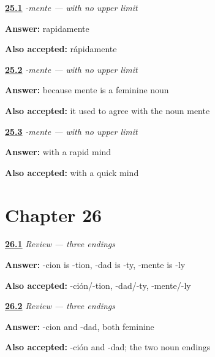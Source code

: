 \noindent\begin{minipage}[t]{\linewidth}
\raggedright
\hyperlink{review-ES-C56-mente-make}{\textbf{25.1}} \emph{-mente — with no upper limit}\par
\small \textbf{Answer:} rapidamente\par
\footnotesize \textbf{Also accepted:} rápidamente
\end{minipage}\par\medskip

\noindent\begin{minipage}[t]{\linewidth}
\raggedright
\hyperlink{review-ES-C56-mente-fem}{\textbf{25.2}} \emph{-mente — with no upper limit}\par
\small \textbf{Answer:} because mente is a feminine noun\par
\footnotesize \textbf{Also accepted:} it used to agree with the noun mente
\end{minipage}\par\medskip

\noindent\begin{minipage}[t]{\linewidth}
\raggedright
\hyperlink{review-ES-C56-mente-literal}{\textbf{25.3}} \emph{-mente — with no upper limit}\par
\small \textbf{Answer:} with a rapid mind\par
\footnotesize \textbf{Also accepted:} with a quick mind
\end{minipage}\par\medskip

\section*{Chapter 26}

\noindent\begin{minipage}[t]{\linewidth}
\raggedright
\hyperlink{review-ES-C56-repaso-amigos-three}{\textbf{26.1}} \emph{Review — three endings}\par
\small \textbf{Answer:} -cion is -tion, -dad is -ty, -mente is -ly\par
\footnotesize \textbf{Also accepted:} -ción/-tion, -dad/-ty, -mente/-ly
\end{minipage}\par\medskip

\noindent\begin{minipage}[t]{\linewidth}
\raggedright
\hyperlink{review-ES-C56-repaso-amigos-gender}{\textbf{26.2}} \emph{Review — three endings}\par
\small \textbf{Answer:} -cion and -dad, both feminine\par
\footnotesize \textbf{Also accepted:} -ción and -dad; the two noun endings
\end{minipage}\par\medskip

